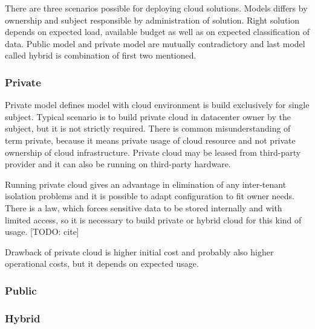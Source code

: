 
There are three scenarios possible for deploying cloud solutions. Models differs by ownership and subject responsible by administration of solution. Right solution depends on expected load, available budget as well as on expected classification of data. Public model and private model are mutually contradictory and last model called hybrid is combination of first two mentioned.

\subsubsection{Private}
Private model defines model with cloud environment is build exclusively for single subject. Typical scenario is to build private cloud in datacenter owner by the subject, but it is not strictly required. There is common misunderstanding of term private, because it means private usage of cloud resource and not private ownership of cloud infrastructure. Private cloud may be leased from third-party provider and it can also be running on third-party hardware.

Running private cloud gives an advantage in elimination of any inter-tenant isolation problems and it is possible to adapt configuration to fit owner needs. There is a law, which forces sensitive data to be stored internally and with limited access, so it is necessary to build private or hybrid cloud for this kind of usage. [TODO: cite]

Drawback of private cloud is higher initial cost and probably also higher operational costs, but it depends on expected usage.

\subsubsection{Public}

\subsubsection{Hybrid}
